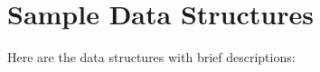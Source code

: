 \section{Sample Data Structures}
Here are the data structures with brief descriptions:\begin{CompactList}
\item{}
\end{CompactList}
